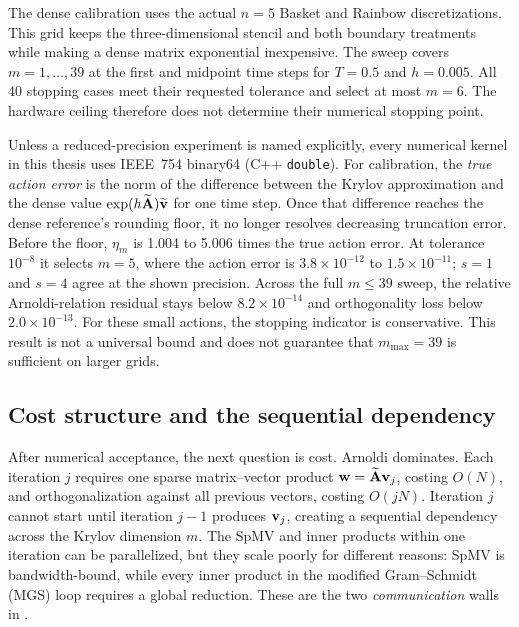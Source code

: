 The dense calibration uses the actual $n=5$ Basket and Rainbow discretizations. This grid keeps the three-dimensional stencil and both boundary treatments while making a dense matrix exponential inexpensive. The sweep covers $m=1,\ldots,39$ at the first and midpoint time steps for $T=0.5$ and $h=0.005$. All 40 stopping cases meet their requested tolerance and select at most $m=6$. The hardware ceiling therefore does not determine their numerical stopping point.

Unless a reduced-precision experiment is named explicitly, every numerical kernel in this thesis uses IEEE~754 binary64 (C++ \texttt{double}). For calibration, the \emph{true action error} is the norm of the difference between the Krylov approximation and the dense value $\exp(h\widetilde{\mathbf{A}})\widetilde{\mathbf{v}}$ for one time step. Once that difference reaches the dense reference's rounding floor, it no longer resolves decreasing truncation error. Before the floor, $\eta_m$ is 1.004 to 5.006 times the true action error. At tolerance $10^{-8}$ it selects $m=5$, where the action error is $3.8\times10^{-12}$ to $1.5\times10^{-11}$; $s=1$ and $s=4$ agree at the shown precision. Across the full $m\le39$ sweep, the relative Arnoldi-relation residual stays below $8.2\times10^{-14}$ and orthogonality loss below $2.0\times10^{-13}$.
For these small actions, the stopping indicator is conservative. This result is not a universal bound and does not guarantee that $m_{\max}=39$ is sufficient on larger grids.

\subsection{Cost structure and the sequential dependency}\label{sec:ksm-cost}

After numerical acceptance, the next question is cost. Arnoldi dominates. Each iteration $j$ requires one sparse matrix--vector product $\mathbf{w}=\widetilde{\mathbf{A}}\mathbf{v}_j$, costing $O(N)$, and orthogonalization against all previous vectors, costing $O(jN)$. Iteration $j$ cannot start until iteration $j-1$ produces $\mathbf{v}_j$, creating a sequential dependency across the Krylov dimension $m$. The SpMV and inner products within one iteration can be parallelized, but they scale poorly for different reasons: SpMV is bandwidth-bound, while every inner product in the modified Gram--Schmidt (MGS) loop requires a global reduction. These are the two \emph{communication} walls in .


